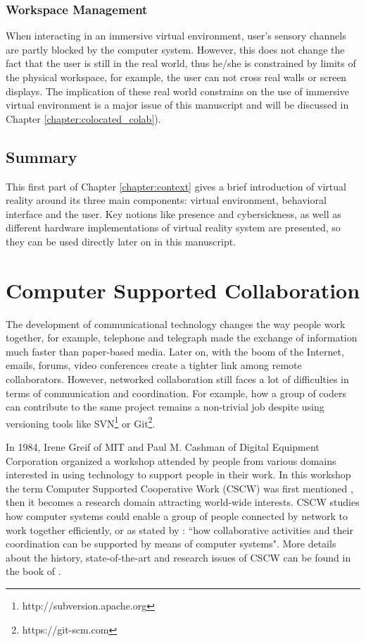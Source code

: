 \subsubsection{Workspace Management}
When interacting in an immersive virtual environment, user's sensory channels are partly blocked by the computer system. However, this does not change the fact that the user is still in the real world, thus he/she is constrained by limits of the physical workspace, for example, the user can not cross real walls or screen displays. The implication of these real world constrains on the use of immersive virtual environment is a major issue of this manuscript and will be discussed in Chapter \ref{chapter:colocated_colab}).


\subsection{Summary}
This first part of Chapter \ref{chapter:context} gives a brief introduction of virtual reality around its three main components: virtual environment, behavioral interface and the user. Key notions like presence and cybersickness, as well as different hardware implementations of virtual reality system are presented, so they can be used directly later on in this manuscript. 


\section{Computer Supported Collaboration}
The development of communicational technology changes the way people work together, for example, telephone and telegraph made the exchange of information much faster than paper-based media. Later on, with the boom of the Internet, emails, forums, video conferences create a tighter link among remote collaborators. However, networked collaboration still faces a lot of difficulties in terms of communication and coordination. For example, how a group of coders can contribute to the same project remains a non-trivial job despite using versioning tools like SVN\footnote{http://subversion.apache.org} or Git\footnote{https://git-scm.com}.

In 1984, Irene Greif of MIT and Paul M. Cashman of Digital Equipment Corporation organized a workshop attended by people from various domains interested in using technology to support people in their work. In this workshop the term Computer Supported Cooperative Work (CSCW) was first mentioned \citep{Grudin1994Computer}, then it becomes a research domain attracting world-wide interests. CSCW studies how computer systems could enable a group of people connected by network to work together efficiently, or as stated by \citet{Carstensen1999CSCW}: ``how collaborative activities and their coordination can be supported by means of computer systems". More details about the history, state-of-the-art and research issues of CSCW can be found in the book of \citet{Beaudouin1999CSCW}.


